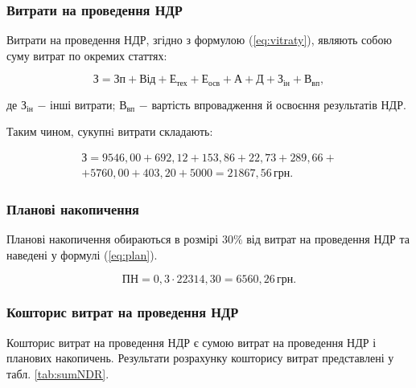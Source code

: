\subsubsection{Витрати на проведення НДР}

Витрати на проведення НДР, згідно з формулою (\ref{eq:vitraty}), являють собою суму витрат по окремих статтях:

\begin{equation}\label{eq:vitraty}
\text{З} = \text{Зп} + \text{Від} + \text{Е}_{\text{тех}} + \text{Е}_{\text{осв}} + \text{А} + \text{Д} + \text{З}_{\text{ін}} + \text{В}_{\text{вп}},
\end{equation}

\noindent де $\text{З}_{\text{ін}}$ $-$ інші витрати; \newline
\hspace*{15pt} $ \text{В}_{\text{вп}}$ $-$ вартість впровадження й освоєння результатів НДР.

Таким чином, сукупнi витрати складають:

\begin{eqnarray*}
\text{З} = 9546,00 + 692,12 + 153,86 + 22,73 + 289,66 + \\ + 5760,00 + 403,20 + 5000  = 21867,56 \, \text{грн}.
\end{eqnarray*}

\vspace{1.5em}

\subsubsection{Планові накопичення}

Планові накопичення обираються в розмірі $30\%$ від витрат на проведення НДР та наведені у формулі (\ref{eq:plan}).

\begin{equation}\label{eq:plan}
\text{ПН} = 0,3 \cdot 22314,30 = 6560,26 \, \text{грн}.
\end{equation}

\vspace{1.5em}

\subsubsection{Кошторис витрат на проведення НДР}

Кошторис витрат на проведення НДР є сумою витрат на проведення НДР і планових накопичень. Результати розрахунку кошторису витрат представлені у табл. \ref{tab:sumNDR}.

